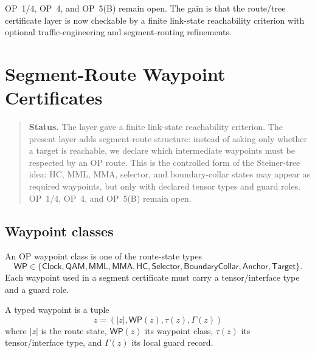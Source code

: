 \begin{remark}
\label{rem:v410r14-op-status}
OP~1/4, OP~4, and OP~5(B) remain open. The gain is that the route/tree
certificate layer is now checkable by a finite link-state reachability
criterion with optional traffic-engineering and segment-routing refinements.
\end{remark}



\clearpage
\section{Segment-Route Waypoint Certificates}
\label{sec:v410r15-segment-route-waypoint-certificates}

\begin{quote}\small
\noindent\textbf{Status.}
The layer gave a finite link-state reachability criterion. The present
layer adds segment-route structure: instead of asking only whether a target
is reachable, we declare which intermediate waypoints must be respected by an
OP route. This is the controlled form of the Steiner-tree idea: HC, MML, MMA,
selector, and boundary-collar states may appear as required waypoints, but only
with declared tensor types and guard roles. OP~1/4, OP~4, and OP~5(B) remain
open.
\end{quote}

\subsection{Waypoint classes}
\label{subsec:v410r15-waypoint-classes}

\begin{definition}
\label{def:v410r15-op-waypoint-class}
An OP waypoint class is one of the route-state types
\[
 \mathsf{WP}
 \in
 \{\mathsf{Clock},\mathsf{QAM},\mathsf{MML},\mathsf{MMA},
 \mathsf{HC},\mathsf{Selector},\mathsf{BoundaryCollar},
 \mathsf{Anchor},\mathsf{Target}\}.
\]
Each waypoint used in a segment certificate must carry a tensor/interface type
and a guard role.
\end{definition}

\begin{definition}
\label{def:v410r15-typed-waypoint}
A typed waypoint is a tuple
\[
 z=(|z|,\mathsf{WP}(z),\tau(z),\Gamma(z))
\]
where \(|z|\) is the route state, \(\mathsf{WP}(z)\) its waypoint class,
\(\tau(z)\) its tensor/interface type, and \(\Gamma(z)\) its local guard
record.
\end{definition}

